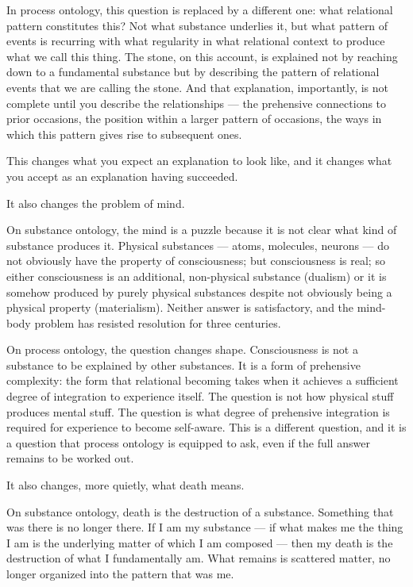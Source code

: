 In process ontology, this question is replaced by a different one:
what relational pattern constitutes this?
Not what substance underlies it, but what pattern of events is recurring
with what regularity in what relational context to produce what we call
this thing.
The stone, on this account, is explained not by reaching down to a
fundamental substance but by describing the pattern of relational events
that we are calling the stone.
And that explanation, importantly, is not complete until you describe
the relationships --- the prehensive connections to prior occasions,
the position within a larger pattern of occasions, the ways in which
this pattern gives rise to subsequent ones.

This changes what you expect an explanation to look like, and it changes
what you accept as an explanation having succeeded.

It also changes the problem of mind.

On substance ontology, the mind is a puzzle because it is not clear what
kind of substance produces it.
Physical substances --- atoms, molecules, neurons --- do not obviously have
the property of consciousness; but consciousness is real; so either
consciousness is an additional, non-physical substance (dualism) or it
is somehow produced by purely physical substances despite not obviously
being a physical property (materialism).
Neither answer is satisfactory, and the mind-body problem has resisted
resolution for three centuries.

On process ontology, the question changes shape.
Consciousness is not a substance to be explained by other substances.
It is a form of prehensive complexity: the form that relational becoming
takes when it achieves a sufficient degree of integration to experience
itself.
The question is not how physical stuff produces mental stuff.
The question is what degree of prehensive integration is required for
experience to become self-aware.
This is a different question, and it is a question that process ontology is
equipped to ask, even if the full answer remains to be worked out.

It also changes, more quietly, what death means.

On substance ontology, death is the destruction of a substance.
Something that was there is no longer there.
If I am my substance --- if what makes me the thing I am is the underlying
matter of which I am composed --- then my death is the destruction of what
I fundamentally am.
What remains is scattered matter, no longer organized into the pattern
that was me.

